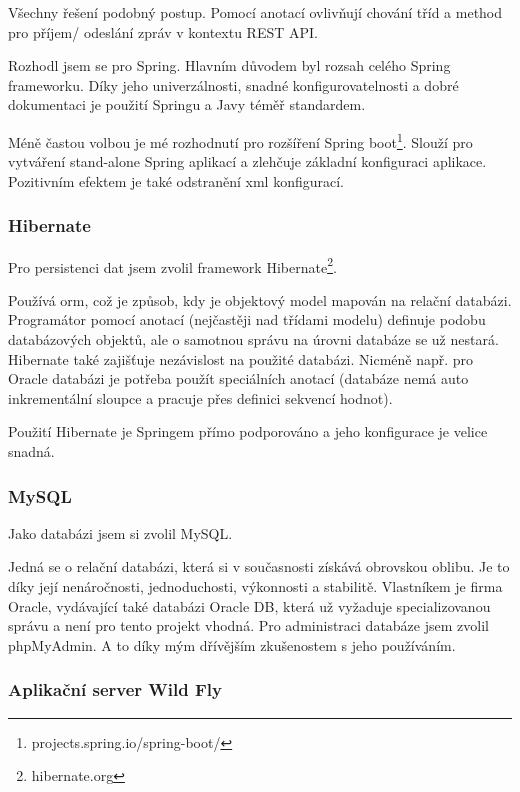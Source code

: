 \documentclass[thesis=B,czech]{FITthesis}[2012/06/26]
\begin{document}
Všechny řešení podobný postup. Pomocí anotací ovlivňují chování tříd a method pro příjem/ odeslání zpráv v kontextu REST API. 

Rozhodl jsem se pro Spring. Hlavním důvodem byl rozsah celého Spring frameworku. Díky jeho univerzálnosti, snadné konfigurovatelnosti a dobré dokumentaci je použití Springu a Javy téměř standardem.    

Méně častou volbou je mé rozhodnutí pro rozšíření Spring boot\footnote{projects.spring.io/spring-boot/}. Slouží pro vytváření stand-alone Spring aplikací a zlehčuje základní konfiguraci aplikace. Pozitivním efektem je také odstranění \acrshort{xml} konfigurací.

\subsubsection{Hibernate}

Pro persistenci dat jsem zvolil framework Hibernate\footnote{hibernate.org}. 

Používá \acrshort{orm}, což je způsob, kdy je objektový model mapován na relační databázi. Programátor pomocí anotací (nejčastěji nad třídami modelu) definuje podobu databázových objektů, ale o samotnou správu na úrovni databáze se už nestará. Hibernate také zajišťuje nezávislost na použité databázi. Nicméně např. pro Oracle databázi je potřeba použít speciálních anotací (databáze nemá auto inkrementální sloupce a pracuje přes definici sekvencí hodnot).

Použití Hibernate je Springem přímo podporováno a jeho konfigurace je velice snadná.

\subsubsection {MySQL}

Jako databázi jsem si zvolil MySQL. 

Jedná se o relační databázi, která si v současnosti získává obrovskou oblibu. Je to díky její nenáročnosti, jednoduchosti, výkonnosti a stabilitě. Vlastníkem je firma Oracle, vydávající také databázi Oracle DB, která už vyžaduje specializovanou správu a není pro tento projekt vhodná. Pro administraci databáze jsem zvolil phpMyAdmin. A to díky mým dřívějším zkušenostem s jeho používáním.  

\subsubsection {Aplikační server Wild Fly}
\end{document}
